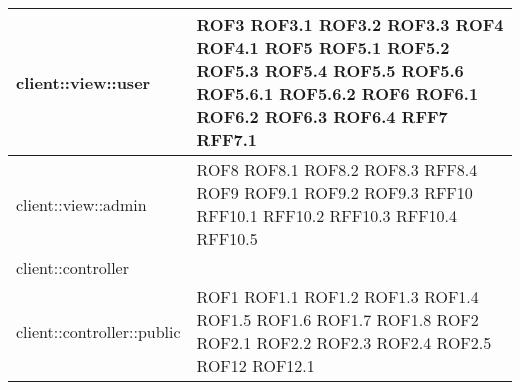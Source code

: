 \begin{center}
\begin{longtable}{| p{9cm} | p{4cm} |}
\hline
client::view::user  &  ROF3 \newline ROF3.1 \newline ROF3.2 \newline ROF3.3 \newline ROF4 \newline ROF4.1 \newline ROF5 \newline ROF5.1 \newline ROF5.2 \newline ROF5.3 \newline ROF5.4 \newline ROF5.5  \newline ROF5.6 \newline ROF5.6.1 \newline ROF5.6.2 \newline ROF6 \newline ROF6.1 \newline ROF6.2 \newline ROF6.3 \newline ROF6.4 \newline RFF7 \newline RFF7.1 \\
\hline
client::view::admin  &  ROF8 \newline ROF8.1 \newline ROF8.2 \newline ROF8.3 \newline RFF8.4 \newline ROF9 \newline ROF9.1 \newline ROF9.2 \newline ROF9.3 \newline RFF10 \newline RFF10.1 \newline RFF10.2 \newline RFF10.3 \newline RFF10.4 \newline RFF10.5 \\
\hline
client::controller  &  \\
\hline
client::controller::public  &  ROF1 \newline ROF1.1 \newline ROF1.2 \newline ROF1.3 \newline ROF1.4 \newline ROF1.5 \newline ROF1.6 \newline ROF1.7 \newline ROF1.8 \newline ROF2 \newline ROF2.1 \newline ROF2.2 \newline ROF2.3 \newline ROF2.4 \newline ROF2.5 \newline ROF12 \newline ROF12.1

\end{longtable}
\end{center}
